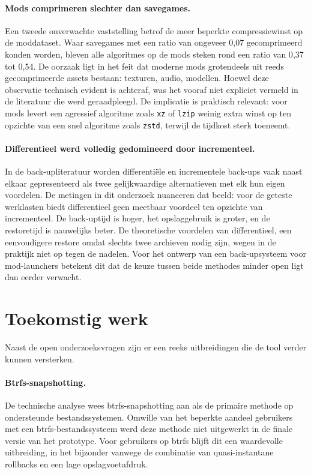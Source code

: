 \paragraph{Mods comprimeren slechter dan savegames.}
Een tweede onverwachte vaststelling betrof de meer beperkte compressiewinst op de moddataset. Waar savegames met een ratio van ongeveer 0{,}07 gecomprimeerd konden worden, bleven alle algoritmes op de mods steken rond een ratio van 0{,}37 tot 0{,}54. De oorzaak ligt in het feit dat moderne mods grotendeels uit reeds gecomprimeerde assets bestaan: texturen, audio, modellen. Hoewel deze observatie technisch evident is achteraf, was het vooraf niet expliciet vermeld in de literatuur die werd geraadpleegd. De implicatie is praktisch relevant: voor mods levert een agressief algoritme zoals \texttt{xz} of \texttt{lzip} weinig extra winst op ten opzichte van een snel algoritme zoals \texttt{zstd}, terwijl de tijdkost sterk toeneemt.

\paragraph{Differentieel werd volledig gedomineerd door incrementeel.}
In de back-upliteratuur worden differentiële en incrementele back-ups vaak naast elkaar gepresenteerd als twee gelijkwaardige alternatieven met elk hun eigen voordelen. De metingen in dit onderzoek nuanceren dat beeld: voor de geteste werklasten biedt differentieel geen meetbaar voordeel ten opzichte van incrementeel. De back-uptijd is hoger, het opslaggebruik is groter, en de restoretijd is nauwelijks beter. De theoretische voordelen van differentieel, een eenvoudigere restore omdat slechts twee archieven nodig zijn, wegen in de praktijk niet op tegen de nadelen. Voor het ontwerp van een back-upsysteem voor mod-launchers betekent dit dat de keuze tussen beide methodes minder open ligt dan eerder verwacht.


\section{Toekomstig werk}
\label{sec:concl-toekomst}

Naast de open onderzoeksvragen zijn er een reeks uitbreidingen die de tool verder kunnen versterken.

\paragraph{Btrfs-snapshotting.}
De technische analyse wees btrfs-snapshotting aan als de primaire methode op ondersteunde bestandssystemen. Omwille van het beperkte aandeel gebruikers met een btrfs-bestandssysteem werd deze methode niet uitgewerkt in de finale versie van het prototype. Voor gebruikers op btrfs blijft dit een waardevolle uitbreiding, in het bijzonder vanwege de combinatie van quasi-instantane rollbacks en een lage opslagvoetafdruk.

